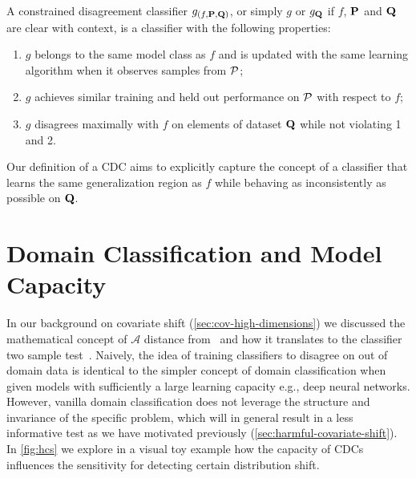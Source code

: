 \begin{definition}
    A constrained disagreement classifier $g_{(f, \mathbf{P}, \mathbf{Q})}$, or simply $g$ or $g_{\mathbf{Q}}$ if $f$, $\mathbf{P}$ and $\mathbf{Q}$ are clear with context, is a classifier with the following properties:
    \begin{enumerate}
        \item $g$ belongs to the same model class as $f$ and is updated with the same learning algorithm when it observes samples from $\mathcal{P}$;
        \item $g$ achieves similar training and held out performance on $\mathcal{P}$ with respect to $f$;
        \item $g$ disagrees maximally with $f$ on elements of dataset $\mathbf{Q}$ while not violating 1 and 2.
    \end{enumerate}
    Our definition of a CDC aims to explicitly capture the concept of a classifier that learns the same generalization region as $f$ while behaving as inconsistently as possible on $\mathbf{Q}$.
\end{definition}


\section{Domain Classification and Model Capacity}\label{sec:relationship-with-learning theory}
In our background on covariate shift (\autoref{sec:cov-high-dimensions}) we discussed the mathematical concept of $\mathcal{A}$ distance from~\citep{atheory, domainrep}
and how it translates to the classifier two sample test~\citep{paz2017revisiting}.
Naively, the idea of training classifiers to disagree on out of domain data is identical to the simpler concept of domain classification when given models with sufficiently a large learning capacity e.g., deep neural networks.
However, vanilla domain classification does not leverage the structure and invariance of the specific problem, which will in general result in a less informative test as we have motivated previously (\autoref{sec:harmful-covariate-shift}).
In \autoref{fig:hcs} we explore in a visual toy example how the capacity of CDCs influences the sensitivity for detecting certain distribution shift.

